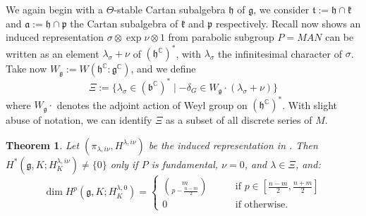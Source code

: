 \documentclass[11pt]{report}
\theoremstyle{definition}
\theoremstyle{plain}
\newtheorem{Theo}[Def]{Theorem}
\newcommand{\complex}{\mathbb{C}}
\newcommand{\Lie}[1]{\mathfrak{#1}}
\begin{document}
\par We again begin with a $\Theta$-stable Cartan subalgebra $\Lie{h}$ of $\Lie{g}$, we consider $\Lie{t}:=\Lie{h}\cap \Lie{k}$ and $\Lie{a}:=\Lie{h}\cap\Lie{p}$ the Cartan subalgebra of $\Lie{k}$ and $\Lie{p}$ respectively. Recall now  shows an induced representation $\sigma\otimes \exp \nu\otimes 1$ from parabolic subgroup $P=MAN$ can be written as an element $\lambda_\sigma+\nu$ of $(\Lie{h}^\complex)^*$, with $\lambda_\sigma$ the infinitesimal character of $\sigma$. Take now $W_\Lie{g}:=W(\Lie{h}^\complex:\Lie{g}^\complex)$, and we define 
\begin{equation}\label{def of Xi}
\Xi:=\{\lambda_{\sigma}\in (\Lie{b}^\complex)^*\mid -\delta_G\in W_\Lie{g}\cdot (\lambda_{\sigma}+\nu)\}
\end{equation}
where $W_\Lie{g}\cdot$ denotes the adjoint action of Weyl group on $(\Lie{h}^\complex)^*$. With slight abuse of notation, we can identify $\Xi$ as a subset of all discrete series of $M$.
\begin{Theo}\label{borel3.5.1}
	\textnormal{\cite[Chapter~III,Theorem~5.1]{borel2013}} Let $(\pi_{\lambda, i\nu},H^{\lambda, i\nu})$ be the induced representation in . Then $H^*(\Lie{g}, K;H^{\lambda,i\nu}_K)\neq\{0\}$ only if $P$ is fundamental, $\nu=0$, and $\lambda\in \Xi$, and:
	\begin{equation}
	\dim H^p(\Lie{g}, K;H^{\lambda,0}_K)=\begin{cases}
	{m \choose p-\frac{n-m}{2}} \qquad &\text{if $p\in [\frac{n-m}{2}, \frac{n+m}{2}]$}\\
	0 \qquad &\text{if otherwise.}
	\end{cases}
	\end{equation}
\end{Theo}
\pagebreak
\end{document}
